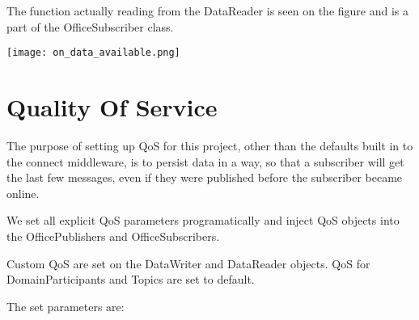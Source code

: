  \begin{center}
\end{center}

The function actually reading from the DataReader is seen on the figure and is a part of the OfficeSubscriber class.

\begin{center}
	\texttt{[image: on\_data\_available.png]}
\end{center}

\section{Quality Of Service}
The purpose of setting up QoS for this project, other than the defaults built in to the connect middleware, is to persist data in a way, so that a subscriber will get the last few messages, even if they were published before the subscriber became online.

We set all explicit QoS parameters programatically and inject QoS objects into the OfficePublishers and OfficeSubscribers. 

Custom QoS are set on the DataWriter and DataReader objects. QoS for DomainParticipants and Topics are set to default.

The set parameters are:


